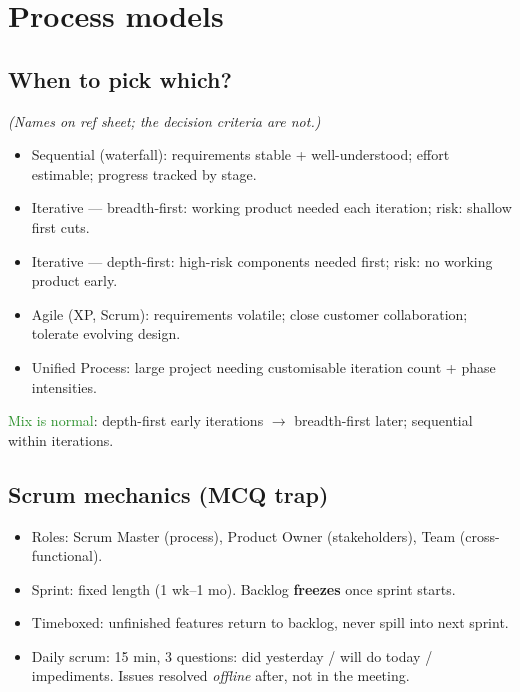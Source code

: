 \section{Process models}

\subsection{When to pick which?}
\textit{(Names on ref sheet; the decision criteria are not.)}
\begin{itemize}
  \item \textcolor{Bittersweet}{Sequential (waterfall)}: requirements stable + well-understood; effort estimable; progress tracked by stage.
  \item \textcolor{Bittersweet}{Iterative — breadth-first}: working product needed each iteration; risk: shallow first cuts.
  \item \textcolor{Bittersweet}{Iterative — depth-first}: high-risk components needed first; risk: no working product early.
  \item \textcolor{Bittersweet}{Agile (XP, Scrum)}: requirements volatile; close customer collaboration; tolerate evolving design.
  \item \textcolor{Bittersweet}{Unified Process}: large project needing customisable iteration count + phase intensities.
\end{itemize}
\textcolor{ForestGreen}{Mix is normal}: depth-first early iterations $\to$ breadth-first later; sequential within iterations.

\subsection{Scrum mechanics (MCQ trap)}
\begin{itemize}
  \item \textcolor{Bittersweet}{Roles}: Scrum Master (process), Product Owner (stakeholders), Team (cross-functional).
  \item \textcolor{Bittersweet}{Sprint}: fixed length (1 wk–1 mo). Backlog \textbf{freezes} once sprint starts.
  \item \textcolor{Bittersweet}{Timeboxed}: unfinished features return to backlog, never spill into next sprint.
  \item \textcolor{Bittersweet}{Daily scrum}: 15 min, 3 questions: did yesterday / will do today / impediments. Issues resolved \emph{offline} after, not in the meeting.
\end{itemize}

